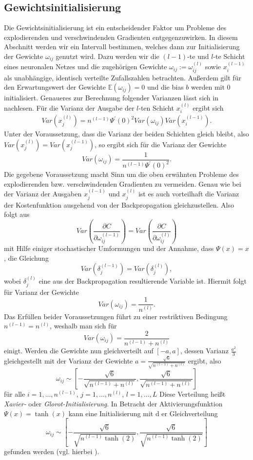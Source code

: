 \subsection{Gewichtsinitialisierung}
\label{subsec:gewichtsinitialisierung}
Die Gewichtsinitialisierung ist ein entscheidender Faktor um Probleme des explodierenden und verschwindenden Gradienten
entgegenzuwirken. In diesem Abschnitt werden wir ein Intervall bestimmen, welches dann zur Initialisierung der Gewichte
$\omega_{ij}$ genutzt wird. Dazu werden wir die $(l-1)$-te und $l$-te Schicht eines neuronalen Netzes und die
zugehörigen Gewichte $\omega_{ij}:=\omega_{ij}^{(l)}$ sowie $x_{i}^{(l-1)}$ als unabhängige, identisch verteilte
Zufallszahlen betrachten. Außerdem gilt für den Erwartungswert der Gewichte $\mathbb{E}(\omega_{ij})=0$ und die bias $b$
werden mit $0$ initialisiert. Genaueres zur Berechnung folgender Varianzen lässt sich in
\cite[191-195]{ovidiucalinDeepLearningArchitectures} nachlesen. Für die Varianz der Ausgabe der $l$-ten Schicht
$x_i^{(l)}$ ergibt sich
\begin{align*}
    Var(x_j^{(l)}) = n^{(l-1)} \Psi^{\prime}(0)^2 Var(\omega_{ij}) Var(x_i^{(l-1)}).
\end{align*}
Unter der Voraussetzung, dass die Varianz der beiden Schichten gleich bleibt, also \\
$Var(x_j^{(l)})=Var(x_j^{(l-1)})$, so ergibt sich für die Varianz der Gewichte
\[
    Var(\omega_{ij}) = \frac{1}{n^{(l-1)}\Psi^{\prime}(0)^2}.
\]
Die gegebene Voraussetzung macht Sinn um die oben erwähnten Probleme des explodierenden bzw. verschwindenden Gradienten
zu vermeiden. Genau wie bei der Varianz der Ausgaben $x_j^{(l-1)}$ und $x_j^{(l)}$ ist es auch vorteilhaft die Varianz
der Kostenfunktion ausgehend von der Backpropagation gleichzustellen. Also folgt aus
\[
    Var(\frac{\partial C}{\partial \omega_{ij}^{(l-1)}}) = Var(\frac{\partial C}{\partial \omega_{ij}^{(l)}})
\]
mit Hilfe einiger stochastischer Umformungen und der Annahme, dass $\Psi(x)=x$, die Gleichung
\[
    Var(\delta_j^{(l-1)}) = Var(\delta_j^{(l)}),
\]
wobei $\delta_j^{(l)}$ eine aus der Backpropagation resultierende Variable ist. Hiermit folgt für Varianz der Gewichte
\[
    Var(\omega_{ij}) = \frac{1}{n^{(l)}}.
\]
Das Erfüllen beider Voraussetzungen führt zu einer restriktiven Bedingung $n^{(l-1)} = n^{(l)}$, weshalb man sich für
\[
    Var(\omega_{ij})= \frac{2}{n^{(l-1)} + n^{(l)}}
\]
einigt. Werden die Gewichte nun gleichverteilt auf $[-a,a]$, dessen Varianz $\frac{a^2}{3}$ gleichgestellt mit der
Varianz der Gewichte $a=\frac{\sqrt {6}}{\sqrt {n^{(l-1)} + n^{(l)}}}$ ergibt, also
\[
    \omega_{ij} \sim
    \left[ -\frac{\sqrt {6}}{\sqrt {n^{(l-1)} + n^{(l)}}}, \frac{\sqrt {6}}{\sqrt {n^{(l-1)} + n^{(l)}}} \right]
\]
für alle $i = 1, \dots, n^{(l-1)}$, $j=1,\dots,n^{(l)}$, $l=1,\dots,L$ Diese Verteilung heißt \textit{Xavier-} oder
\textit{Glorot-Initialisierung}. In Betracht der Aktivierungsfunktion $\Psi(x)=\tanh(x)$ kann eine Initialisierung mit d
er Gleichverteilung
\[
    \omega_{ij} \sim
    \left[ -\frac{\sqrt {6}}{\sqrt {n^{(l-1)} \tanh(2)}}, \frac{\sqrt {6}}{\sqrt {n^{(l-1)} \tanh(2)}} \right]
\]
gefunden werden (vgl. hierbei \cite[27]{remcovandermeerSolvingPartialDifferential}).

